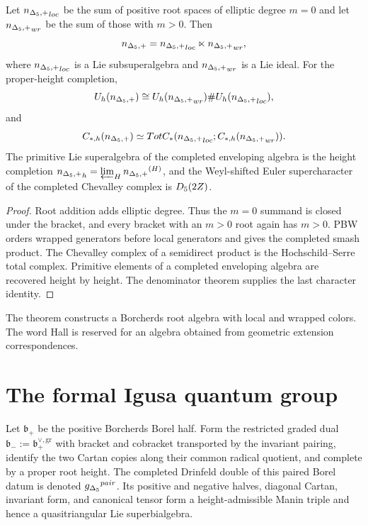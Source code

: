 \begin{theorem}
Let ${n_{\Delta_5,+}}_{loc}$ be the sum of positive root spaces of elliptic degree $m=0$ and let ${n_{\Delta_5,+}}_{wr}$ be the sum of those with $m>0$.  Then
\[
 {n_{\Delta_5,+}}={n_{\Delta_5,+}}_{loc}\ltimes{n_{\Delta_5,+}}_{wr},
\]
where ${n_{\Delta_5,+}}_{loc}$ is a Lie subsuperalgebra and ${n_{\Delta_5,+}}_{wr}$ is a Lie ideal.  For the proper-height completion,
\[
 U_h({n_{\Delta_5,+}})
 \cong
 U_h({n_{\Delta_5,+}}_{wr})\#U_h({n_{\Delta_5,+}}_{loc}),
\]
and
\[
 C_{*,h}({n_{\Delta_5,+}})
 \simeq
 Tot C_*({n_{\Delta_5,+}}_{loc};C_{*,h}({n_{\Delta_5,+}}_{wr})).
\]
The primitive Lie superalgebra of the completed enveloping algebra is the height completion ${n_{\Delta_5,+}}_h=\varprojlim_H{n_{\Delta_5,+}}^{(H)}$, and the Weyl-shifted Euler supercharacter of the completed Chevalley complex is ${D_5}(2Z)$.
\end{theorem}
\begin{proof}
Root addition adds elliptic degree.  Thus the $m=0$ summand is closed under the bracket, and every bracket with an $m>0$ root again has $m>0$.  PBW orders wrapped generators before local generators and gives the completed smash product.  The Chevalley complex of a semidirect product is the Hochschild--Serre total complex.  Primitive elements of a completed enveloping algebra are recovered height by height.  The denominator theorem supplies the last character identity.
\end{proof}

\begin{remark}
The theorem constructs a Borcherds root algebra with local and wrapped colors.  The word Hall is reserved for an algebra obtained from geometric extension correspondences.
\end{remark}

\chapter{The formal Igusa quantum group}
Let $\mathfrak b_+$ be the positive Borcherds Borel half.  Form the restricted graded dual $\mathfrak b_-:=\mathfrak b_+^{\vee,\mathrm{gr}}$ with bracket and cobracket transported by the invariant pairing, identify the two Cartan copies along their common radical quotient, and complete by a proper root height.  The completed Drinfeld double of this paired Borel datum is denoted ${g_{\Delta_5}}^{pair}$.  Its positive and negative halves, diagonal Cartan, invariant form, and canonical tensor form a height-admissible Manin triple and hence a quasitriangular Lie superbialgebra.

